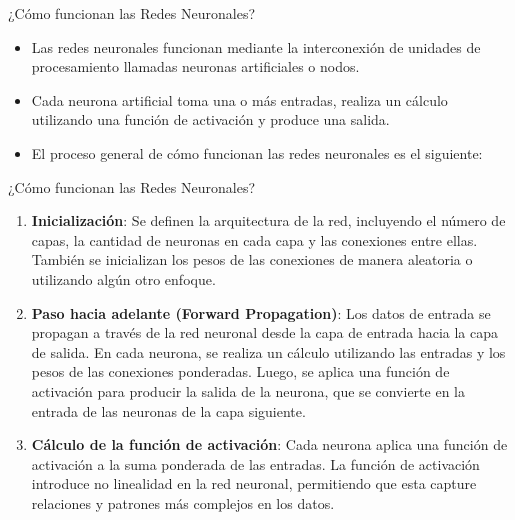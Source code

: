 \documentclass[11pt,aspectratio=169]{beamer}
\begin{document}
\begin{frame}{¿Cómo funcionan las Redes Neuronales?}
	\begin{itemize}
		\item Las redes neuronales funcionan mediante la interconexión de unidades de procesamiento llamadas neuronas artificiales o nodos.\pause
		\item Cada neurona artificial toma una o más entradas, realiza un cálculo utilizando una función de activación y produce una salida.\pause
		\item El proceso general de cómo funcionan las redes neuronales es el siguiente:\pause
	\end{itemize}
\end{frame}

\begin{frame}{¿Cómo funcionan las Redes Neuronales?}
	\begin{enumerate}
		\item \textbf{Inicialización}: Se definen la arquitectura de la red, incluyendo el número de capas, la cantidad de neuronas en cada capa y las 
			conexiones entre ellas. También se inicializan los pesos de las conexiones de manera aleatoria o utilizando algún otro enfoque.\pause
		\item \textbf{Paso hacia adelante (Forward Propagation)}: Los datos de entrada se propagan a través de la red neuronal desde la capa de 
			entrada hacia la capa de salida. \pause En cada neurona, se realiza un cálculo utilizando las entradas y los pesos de las conexiones 
			ponderadas. \pause Luego, se aplica una función de activación para producir la salida de la neurona, que se convierte en la entrada de 
			las neuronas de la capa siguiente.\pause
		\item \textbf{Cálculo de la función de activación}: Cada neurona aplica una función de activación a la suma ponderada de las entradas. 
			\pause La función de activación introduce no linealidad en la red neuronal, permitiendo que esta capture relaciones y patrones más 
			complejos en los datos.
	\end{enumerate}
\end{frame}
\end{document}
